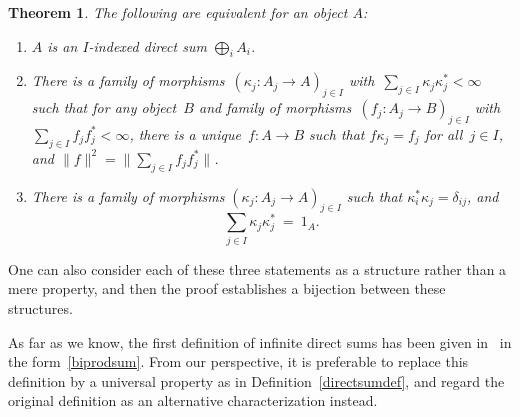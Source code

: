\documentclass[reqno,T1]{amsproc}
\newcommand{\beq}{\begin{equation}}
\newcommand{\eeq}{\end{equation}}
\theoremstyle{plain}
\newtheorem{thm}{Theorem}[section]
\theoremstyle{remark}
\numberwithin{equation}{section}
\begin{document}
\begin{thm}
The following are equivalent for an object $A$:
\begin{enumerate}
\item\label{universalprop} $A$ is an $I$-indexed direct sum $\bigoplus_i A_i$.
\item\label{universalprop2} 
There is a family of
        morphisms~$\left(\kappa_j : A_j \to A\right)_{j\in I}$
        with~$\sum_{j \in I} \kappa_j \kappa_j^* < \infty$
        such that for any object~$B$
        and family of
        morphisms~$\left(f_j: A_j \to B\right)_{j\in I}$
        with~$\sum_{j \in I}f_j f_j^* < \infty$,
        there is a unique~$f\colon A \to B$
        such that $f \kappa_j = f_j$ for all~$j \in I$, and $\| f \|^2 = \| \sum_{j\in I} f_j f_j^* \|$.
\item\label{biprodsum} There is a family of morphisms $\left(\kappa_j : A_j \to A\right)_{j\in I}$ such that $\kappa_i^*\kappa_j = \delta_{ij}$, and
\beq
\label{complete}
        \sum_{j\in I} \kappa_j \kappa_j^* \ =\  1_A.
\eeq
\end{enumerate}
\end{thm}

One can also consider each of these three statements as a structure rather than a mere property, and then the proof establishes a bijection between these structures.

As far as we know, the first definition of infinite direct sums has been given in~\cite[p.~100]{wstarcat} in the form~\ref{biprodsum}. From our perspective, it is preferable to replace this definition by a universal property as in Definition~\ref{directsumdef}, and regard the original definition as an alternative characterization instead.
\end{document}
